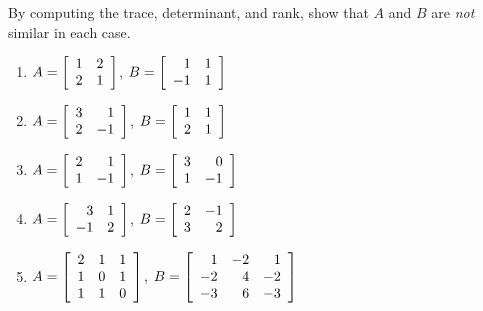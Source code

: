 \begin{multicols}{2}
\begin{ex}
By computing the trace, determinant, and rank, show that $A$ and $B$ are \textit{not} similar in each case.

\begin{enumerate}[label={\alph*.}]
\item $A = \left[ \begin{array}{rr}
	1 & 2 \\
	2 & 1
\end{array} \right]$, $B =
\left[ \begin{array}{rr}
	1 & 1\\
	-1 & 1
\end{array} \right]$

\item $A = 
\left[ \begin{array}{rr}
3 & 1 \\
2 & -1
\end{array} \right]$, $B =
\left[ \begin{array}{rr}
1 & 1 \\
2 & 1
\end{array} \right]$

\item $A =
\left[ \begin{array}{rr}
2 & 1 \\
1 & -1 
\end{array} \right]$, $B =
\left[ \begin{array}{rr}
3 & 0 \\
1 & -1
\end{array} \right]$

\item $A = 
\left[ \begin{array}{rr}
3 & 1 \\
-1 & 2 
\end{array} \right]$, $B =
\left[ \begin{array}{rr}
2 & -1 \\
3 & 2
\end{array} \right]$

\item $A = 
\left[ \begin{array}{rrr}
2 & 1 & 1 \\
1 & 0 & 1 \\
1 & 1 & 0
\end{array} \right]$, $B = 
\left[ \begin{array}{rrr}
 1 & -2 & 1 \\
-2 & 4 & -2 \\
-3 & 6 & -3 
\end{array} \right]$


\end{enumerate}
\end{ex}
\end{multicols}
